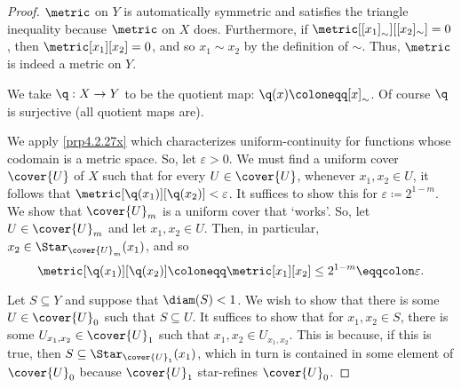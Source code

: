 \begin{thm}{}{}
\begin{proof}
$\metric$ on $Y$ is automatically symmetric and satisfies the triangle inequality because $\metric$ on $X$ does.  Furthermore, if $\metric[[x_1]_{\sim}][[x_2]_{\sim}]=0$, then $\metric[x_1][x_2]=0$, and so $x_1\sim x_2$ by the definition of $\sim$.  Thus, $\metric$ is indeed a metric on $Y$.

We take $\q :X\rightarrow Y$ to be the quotient map:  $\q (x)\coloneqq [x]_{\sim}$.  Of course $\q$ is surjective (all quotient maps are).

We apply \cref{prp4.2.27x} which characterizes uniform-continuity for functions whose codomain is a metric space.  So, let $\varepsilon >0$.  We must find a uniform cover $\cover{U}$ of $X$ such that for every $U\in \cover{U}$, whenever $x_1,x_2\in U$, it follows that $\metric[\q (x_1)][\q (x_2)]<\varepsilon$.  It suffices to show this for $\varepsilon \coloneqq 2^{1-m}$.  We show that $\cover{U}_m$ is a uniform cover that `works'.  So, let $U\in \cover{U}_m$ and let $x_1,x_2\in U$.   Then, in particular, $x_2\in \Star _{\cover{U}_m}(x_1)$, and so
\begin{equation}
\metric[\q (x_1)][\q (x_2)]\coloneqq \metric[x_1][x_2]\leq 2^{1-m}\eqqcolon \varepsilon .
\end{equation}

Let $S\subseteq Y$ and suppose that $\diam (S)<1$.  We wish to show that there is some $U\in \cover{U}_0$ such that $S\subseteq U$.  It suffices to show that for $x_1,x_2\in S$, there is some $U_{x_1,x_2}\in \cover{U}_1$ such that $x_1,x_2\in U_{x_1,x_2}$.  This is because, if this is true, then $S\subseteq \Star _{\cover{U}_1}(x_1)$, which in turn is contained in some element of $\cover{U}_0$ because $\cover{U}_1$ star-refines $\cover{U}_0$.


\end{proof}
\end{thm}
